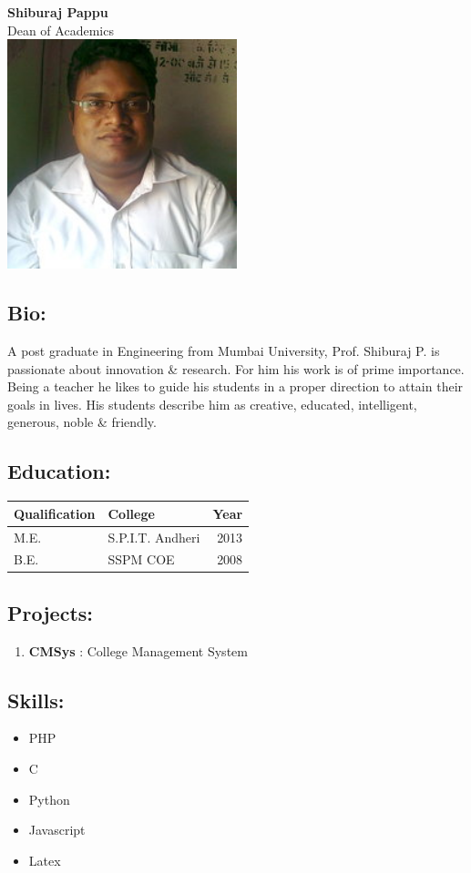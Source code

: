 \documentclass{report}
\begin{document}
	\begin{center}
		{\Huge \textbf{Shiburaj Pappu}} \\[0.5cm]
		{\large Dean of Academics}\\[0.5cm]
		\includegraphics[width=0.5\textwidth]{photo.jpg}
	\end{center}
	
	\subsection*{Bio:}
	A post graduate in Engineering from Mumbai University, Prof. Shiburaj P. is passionate about innovation \& research. For him his work is of prime importance. Being a teacher he likes to guide his students in a proper direction to attain their goals in lives. His students describe him as creative, educated, intelligent, generous, noble \& friendly.
	
	\subsection*{Education:}
	\begin{table}[h!]
		\centering
		\begin{tabular}{|l|l|r|}
			\hline
			\textbf{Qualification} & \textbf{College} & \textbf{Year} \\
			\hline
			M.E. & S.P.I.T. Andheri & 2013 \\
			\hline
			B.E. & SSPM COE & 2008 \\
			\hline
		\end{tabular}
	\end{table}
	
	\subsection*{Projects:}
	\begin{enumerate}
		\item \textbf{CMSys} : College Management System
	\end{enumerate}
	
	\subsection*{Skills:}
	\begin{itemize}
		\item PHP
		\item C
		\item Python
		\item Javascript
		\item Latex
	\end{itemize}
\end{document}

